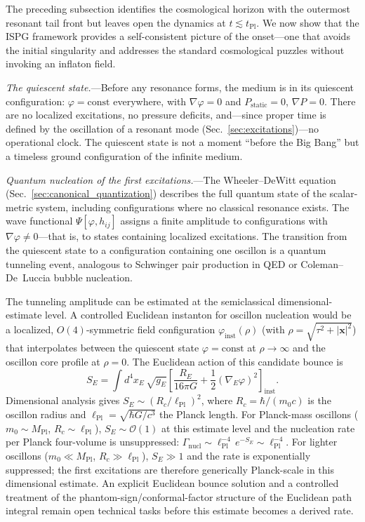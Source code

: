 \documentclass[aps,prd,onecolumn,superscriptaddress,nofootinbib,showpacs,12pt,notitlepage]{revtex4-2}
\newcommand{\Mpl}{M_{\mathrm{Pl}}}
\renewcommand{\order}[1]{\mathcal{O}\!\left(#1\right)}
\begin{document}
The preceding subsection identifies the cosmological
horizon with the outermost resonant tail front but
leaves open the dynamics at $t \lesssim t_{\mathrm{Pl}}$.
We now show that the ISPG framework provides a
self-consistent picture of the onset---one that avoids
the initial singularity and addresses the standard
cosmological puzzles without invoking an inflaton field.

\textit{The quiescent state.}---Before any resonance
forms, the medium is in its quiescent configuration:
$\varphi = \mathrm{const}$ everywhere, with
$\nabla\varphi = 0$ and
$P_{\mathrm{static}} = 0$, $\nabla P = 0$.  There are
no localized excitations, no pressure deficits, and---since
proper time is defined by the oscillation of a resonant
mode (Sec.~\ref{sec:excitations})---no operational clock.
The quiescent state is not a moment ``before the Big
Bang'' but a timeless ground configuration of the
infinite medium.

\textit{Quantum nucleation of the first excitations.}---The
Wheeler--DeWitt equation
(Sec.~\ref{sec:canonical_quantization}) describes the
full quantum state of the scalar-metric system,
including configurations where no classical resonance
exists.  The wave functional $\Psi[\varphi, h_{ij}]$
assigns a finite amplitude to configurations with
$\nabla\varphi \neq 0$---that is, to states containing
localized excitations.  The transition from the quiescent
state to a configuration containing one oscillon is a
quantum tunneling event, analogous to Schwinger pair
production in QED or Coleman--De~Luccia bubble
nucleation.

The tunneling amplitude can be estimated at the
semiclassical dimensional-estimate level.  A controlled
Euclidean instanton for oscillon nucleation would be a
localized, $O(4)$-symmetric field configuration
$\varphi_{\mathrm{inst}}(\rho)$ (with
$\rho = \sqrt{\tau^2 + |\mathbf{x}|^2}$) that
interpolates between the quiescent state
$\varphi = \mathrm{const}$ at $\rho \to \infty$
and the oscillon core profile at $\rho = 0$.  The
Euclidean action of this candidate bounce is
\begin{equation}\label{eq:S_nucleation}
  S_E
  = \int d^4x_E\,\sqrt{g_E}\left[
    \frac{R_E}{16\pi G}
    + \frac{1}{2}(\nabla_E\varphi)^2
  \right]_{\mathrm{inst}}.
\end{equation}
Dimensional analysis gives
$S_E \sim (R_c/\ell_{\mathrm{Pl}})^2$, where
$R_c = \hbar/(m_0 c)$ is the oscillon radius and
$\ell_{\mathrm{Pl}} = \sqrt{\hbar G/c^3}$ the Planck
length.  For Planck-mass oscillons
($m_0 \sim \Mpl$, $R_c \sim \ell_{\mathrm{Pl}}$),
$S_E \sim \order{1}$ at this estimate level and the
nucleation rate per Planck four-volume is unsuppressed:
$\Gamma_{\mathrm{nucl}} \sim
\ell_{\mathrm{Pl}}^{-4}\,e^{-S_E}
\sim \ell_{\mathrm{Pl}}^{-4}$.
For lighter oscillons ($m_0 \ll \Mpl$,
$R_c \gg \ell_{\mathrm{Pl}}$), $S_E \gg 1$ and the
rate is exponentially suppressed; the first excitations
are therefore generically Planck-scale in this
dimensional estimate.  An explicit Euclidean bounce
solution and a controlled treatment of the
phantom-sign/conformal-factor structure of the Euclidean
path integral remain open technical tasks before this
estimate becomes a derived rate.
\end{document}
